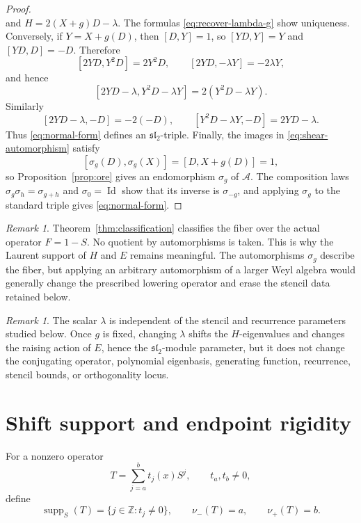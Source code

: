 \documentclass[11pt,reqno]{amsart}
\numberwithin{equation}{section}
\theoremstyle{definition}
\theoremstyle{remark}
\newtheorem{remark}[theorem]{Remark}
\newcommand{\Z}{\mathbb Z}
\newcommand{\algA}{\mathcal A}
\newcommand{\supp}{\operatorname{supp}}
\newcommand{\id}{\operatorname{Id}}
\begin{document}
\begin{proof}
\[\]
and $H=2(X+g)D-\lambda$.  The formulas \eqref{eq:recover-lambda-g} show uniqueness. Conversely, if $Y=X+g(D)$, then $[D,Y]=1$, so $[YD,Y]=Y$ and $[YD,D]=-D$.  Therefore
\[
 [2YD,Y^2D]=2Y^2D,
 \qquad
 [2YD,-\lambda Y]=-2\lambda Y,
\]
and hence
\[
 [2YD-\lambda,Y^2D-\lambda Y]=2(Y^2D-\lambda Y).
\]
Similarly
\[
 [2YD-\lambda,-D]=-2(-D),
 \qquad
 [Y^2D-\lambda Y,-D]=2YD-\lambda.
\]
Thus \eqref{eq:normal-form} defines an $\mathfrak{sl}_2$-triple.  Finally, the images in \eqref{eq:shear-automorphism} satisfy
\[
 [\sigma_g(D),\sigma_g(X)]=[D,X+g(D)]=1,
\]
so Proposition~\ref{prop:ore} gives an endomorphism $\sigma_g$ of $\algA$.  The composition laws $\sigma_g\sigma_h=\sigma_{g+h}$ and $\sigma_0=\id$ show that its inverse is $\sigma_{-g}$, and applying $\sigma_g$ to the standard triple gives \eqref{eq:normal-form}.
\end{proof}

\begin{remark}\label{rem:relative-category}
Theorem~\ref{thm:classification} classifies the fiber over the actual operator $F=1-S$.  No quotient by automorphisms is taken.  This is why the Laurent support of $H$ and $E$ remains meaningful.  The automorphisms $\sigma_g$ describe the fiber, but applying an arbitrary automorphism of a larger Weyl algebra would generally change the prescribed lowering operator and erase the stencil data retained below.
\end{remark}

\begin{remark}\label{rem:lambda}
The scalar $\lambda$ is independent of the stencil and recurrence parameters studied below.  Once $g$ is fixed, changing $\lambda$ shifts the $H$-eigenvalues and changes the raising action of $E$, hence the $\mathfrak{sl}_2$-module parameter, but it does not change the conjugating operator, polynomial eigenbasis, generating function, recurrence, stencil bounds, or orthogonality locus.
\end{remark}

\section{Shift support and endpoint rigidity}

For a nonzero operator
\[
 T=\sum_{j=a}^{b}t_j(x)S^j,
 \qquad
 t_a,t_b\ne0,
\]
define
\[
 \supp_S(T)=\{j\in\Z:t_j\ne0\},
 \qquad
 \nu_-(T)=a,
 \qquad
 \nu_+(T)=b.
\]
\end{document}
